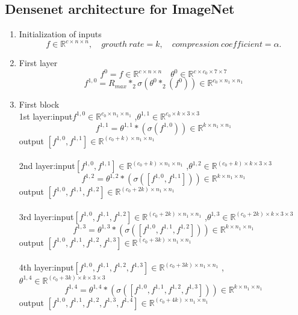 \subsection{Densenet architecture for ImageNet}
\begin{enumerate}
\item Initialization of inputs
$$
f \in \mathbb{R}^{c\times n\times n}, \quad
growth~rate = k, \quad
compression~coefficient = \alpha.
$$
\item First layer
$$f^0=f\in \mathbb{R}^{c\times n\times n} \quad \theta^0 \in \mathbb{R}^{c\times c_0\times 7\times 7}$$
$$f^{1,0}=R_{max} \ast_2 \sigma(\theta^{0} \ast_2 (f^0))\in \mathbb{R}^{c_0\times n_1\times n_1}$$
\item First block\\
1st layer:\quad input$f^{1,0}\in \mathbb{R}^{c_0\times n_1\times n_1}$ ,$\theta^{1,1} \in \mathbb{R}^{c_0\times k\times 3\times 3}$
$$f^{1,1}=\theta^{1,1} \ast (\sigma(f^{1,0}))\in \mathbb{R}^{k\times n_1\times n_1}$$
\quad\quad\quad\quad\quad output $[f^{1,0},f^{1,1}] \in \mathbb{R}^{(c_0+k)\times n_1\times n_1}$
\\ \hspace*{\fill} \\
2nd layer:\quad input$[f^{1,0},f^{1,1}] \in \mathbb{R}^{(c_0+k)\times n_1\times n_1}$ ,$\theta^{1,2} \in \mathbb{R}^{(c_0+k)\times k\times3\times 3 }$
$$ f^{1,2}=\theta^{1,2} \ast (\sigma([f^{1,0},f^{1,1}]))\in \mathbb{R}^{k\times n_1\times n_1}$$
\quad\quad\quad\quad\quad output $[f^{1,0},f^{1,1}, f^{1,2}] \in \mathbb{R}^{(c_0+2k)\times n_1\times n_1}$
\\ \hspace*{\fill} \\
3rd layer:\quad input$[f^{1,0},f^{1,1},f^{1,2}] \in \mathbb{R}^{(c_0+2k)\times n_1\times n_1}$ ,$\theta^{1,3} \in \mathbb{R}^{ (c_0+2k)\times k\times 3\times 3 }$
$$ f^{1,3}=\theta^{1,3} \ast (\sigma([f^{1,0},f^{1,1},f^{1,2}]))\in \mathbb{R}^{k\times n_1\times n_1}$$
\quad\quad\quad\quad\quad output $[f^{1,0},f^{1,1}, f^{1,2},f^{1,3}] \in \mathbb{R}^{(c_0+3k)\times n_1\times n_1}$
\\ \hspace*{\fill} \\
4th layer:\quad input$[f^{1,0},f^{1,1},f^{1,2},f^{1,3}] \in \mathbb{R}^{(c_0+3k)\times n_1\times n_1}$ ,$\theta^{1,4} \in \mathbb{R}^{ (c_0+3k)\times k\times 3\times 3}$
$$ f^{1,4}=\theta^{1,4} \ast (\sigma([f^{1,0},f^{1,1},f^{1,2},f^{1,3}]))\in \mathbb{R}^{k\times n_1\times n_1}$$
\quad\quad\quad\quad\quad output $[f^{1,0},f^{1,1}, f^{1,2},f^{1,3},f^{1,4}] \in \mathbb{R}^{(c_0+4k)\times n_1\times n_1}$

\end{enumerate}
